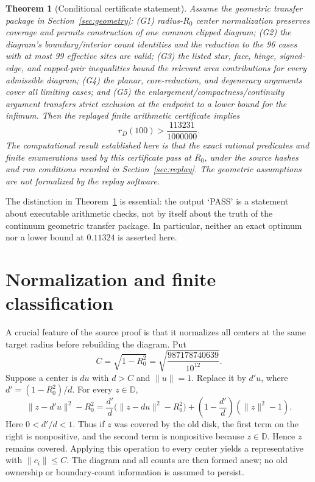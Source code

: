 \documentclass[11pt]{article}
\newtheorem{theorem}{Theorem}
\newcommand{\D}{\mathbb D}
\newcommand{\rd}{r_D}
\newcommand{\cR}{R_0}
\begin{document}
\begin{theorem}[Conditional certificate statement]\label{thm:conditional}
Assume the geometric transfer package in Section~\ref{sec:geometry}: (G1) radius-$\cR$ center normalization preserves coverage and permits construction of one common clipped diagram; (G2) the diagram's boundary/interior count identities and the reduction to the 96 cases with at most 99 effective sites are valid; (G3) the listed star, face, hinge, signed-edge, and capped-pair inequalities bound the relevant area contributions for every admissible diagram; (G4) the planar, core-reduction, and degeneracy arguments cover all limiting cases; and (G5) the enlargement/compactness/continuity argument transfers strict exclusion at the endpoint to a lower bound for the infimum. Then the replayed finite arithmetic certificate implies
\[
 \rd(100)>\frac{113231}{1000000}.
\]
The computational result established here is that the exact rational predicates and finite enumerations used by this certificate pass at $\cR$, under the source hashes and run conditions recorded in Section~\ref{sec:replay}. The geometric assumptions are not formalized by the replay software.
\end{theorem}

The distinction in Theorem~\ref{thm:conditional} is essential: the output `PASS' is a statement about executable arithmetic checks, not by itself about the truth of the continuum geometric transfer package. In particular, neither an exact optimum nor a lower bound at $0.11324$ is asserted here.

\section{Normalization and finite classification}
\label{sec:architecture}
A crucial feature of the source proof is that it normalizes all centers at the same target radius before rebuilding the diagram. Put
\[
 C=\sqrt{1-\cR^2}=\sqrt{\frac{987178740639}{10^{12}}}.
\]
Suppose a center is $du$ with $d>C$ and $\|u\|=1$. Replace it by $d'u$, where $d'=(1-\cR^2)/d$. For every $z\in\D$,
\begin{equation}\label{eq:normalize}
 \|z-d'u\|^2-\cR^2=\frac{d'}d\bigl(\|z-du\|^2-\cR^2\bigr)+\left(1-\frac{d'}d\right)(\|z\|^2-1).
\end{equation}
Here $0<d'/d<1$. Thus if $z$ was covered by the old disk, the first term on the right is nonpositive, and the second term is nonpositive because $z\in\D$. Hence $z$ remains covered. Applying this operation to every center yields a representative with $\|c_i\|\leq C$. The diagram and all counts are then formed anew; no old ownership or boundary-count information is assumed to persist.
\end{document}
